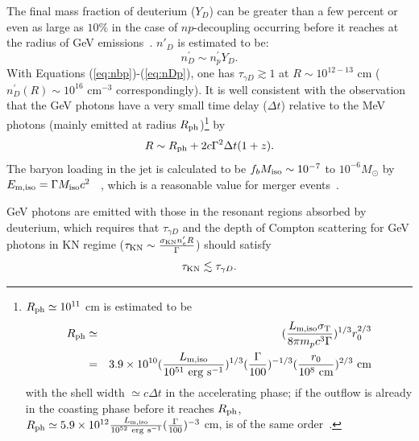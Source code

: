 \documentclass[linenumbers,twocolumn]{aastex631}
\begin{document}
The final mass fraction of deuterium ($Y_{D}$) can be greater than a few percent or even as large as $10\%$ in the case of $np$-decoupling occurring before it reaches at the radius of GeV emissions~\citep[see the simulation in ][]{2002ApJ...580..368P}. $n'_{D}$ is estimated to be:
\begin{equation}\label{eq:nDp}
   n^{\prime}_{ D}\sim n^{\prime}_{p} Y_{D}.
\end{equation}
 With Equations (\ref{eq:nbp})-(\ref{eq:nDp}), one has $\tau_{\gamma D}\gtrsim1$ at $R\sim10^{12-13}$ cm ($n^{\prime}_{D}(R)\sim10^{16}$ cm$^{-3}$ correspondingly). It is well consistent with the observation that the GeV photons have a very small time delay ($\Delta t$) relative to the MeV photons (mainly emitted at radius $R_{\rm ph}$)\footnote{$R_{\rm ph}\simeq10^{11}$ cm is estimated to be 
 \begin{eqnarray}
    R_{\rm ph}&\simeq&(\frac{L_{\rm m,iso}\sigma_{\rm T}}{8\pi m_pc^3\Gamma})^{1/3} r_0^{2/3}\nonumber\\
    &=&3.9\times10^{10} (\frac{L_{\rm m,iso}}{10^{51} \ \rm erg \ s^{-1}})^{1/3} (\frac{\Gamma}{100})^{-1/3}(\frac{r_0}{10^8\ \rm cm})^{2/3} \ \rm cm \nonumber
 \end{eqnarray}
 with the shell width $\simeq c\Delta t$ in the accelerating phase; if the outflow is already in the coasting phase before it reaches $R_{\rm ph}$,  $R_{\rm ph}\simeq 5.9\times10^{12}\frac{L_{\rm m,iso}}{10^{52}\ \rm erg \ s^{-1}} (\frac{\Gamma}{100})^{-3}$ cm, is of the same order~\citep{2000ApJ...530..292M}.}   by 
 \begin{equation}
   R\sim R_{\rm ph} + 2c\Gamma^2\Delta t(1+z).  
 \end{equation}
 The baryon loading in the jet is calculated to be $f_{b}M_{\rm iso}\sim10^{-7}$ to $10^{-6}M_{\odot}$ by $E_{\rm m, iso}=\Gamma M_{\rm iso}c^2$ ~\citep[the typical beaming factor for short GRBs is $f_b\sim6\times10^{-3}$, see][]{2014ARA&A..52...43B}, which is a reasonable value for merger events~\citep{2019LRR....23....1M,2025PhRvD.111f3040S}.
 
 GeV photons are emitted with those in the resonant regions absorbed by deuterium, which requires that $\tau_{\gamma D}$ and the depth of Compton scattering for GeV photons in KN regime ($\tau_{\rm KN}\sim\frac{\sigma_{\rm KN} n'_{e}R}{\Gamma}$) should satisfy 
\begin{equation}\label{eq:criterion}
    \tau_{\rm KN}\lesssim \tau_{\gamma D}.
\end{equation}
\end{document}
